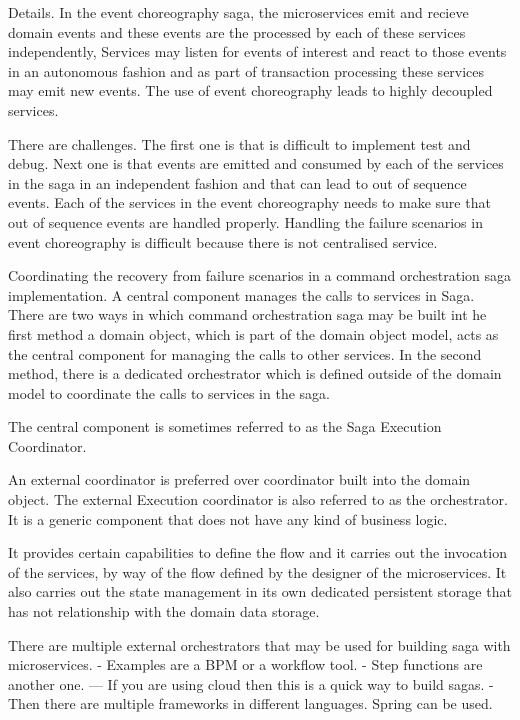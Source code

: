 Details.
In the event choreography saga, the microservices emit and recieve domain events and these events are the processed by each of these services independently,
Services may listen for events of interest and react to those events in an autonomous fashion and as part of transaction processing these services may emit new events.
The use of event choreography leads to highly decoupled services.

There are challenges.
The first one is that is difficult to implement test and debug.
Next one is that events are emitted and consumed by each of the services in the saga in an independent fashion and that can lead to out of sequence events.
Each of the services in the event choreography needs to make sure that out of sequence events are handled properly.
Handling the failure scenarios in event choreography is difficult because there is not centralised service.

Coordinating the recovery from failure scenarios in a command orchestration saga implementation.
A central component manages the calls to services in Saga.
There are two ways in which command orchestration saga may be built int he first method a domain object, which is part of the domain object model, acts as the central component for managing the calls to other services.
In the second method, there is a dedicated orchestrator which is defined outside of the domain model to coordinate the calls to services in the saga.

The central component is sometimes referred to as the Saga Execution Coordinator.

An external coordinator is preferred over coordinator built into the domain object.
The external Execution coordinator is also referred to as the orchestrator.
It is a generic component that does not have any kind of business logic.

It provides certain capabilities to define the flow and it carries out the invocation of the services, by way of the flow defined by the designer of the microservices.
It also carries out the state management in its own dedicated persistent storage that has not relationship with the domain data storage.

There are multiple external orchestrators that may be used for building saga with microservices.
- Examples are a BPM or a workflow tool.
- Step functions are another one.
--- If you are using cloud then this is a quick way to build sagas.
- Then there are multiple frameworks in different languages. Spring can be used.

